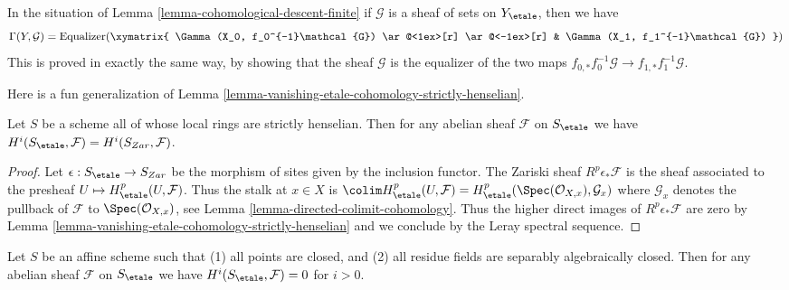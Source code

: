 \begin{remark}
\label{remark-cohomological-descent-finite}
In the situation of Lemma \ref{lemma-cohomological-descent-finite}
if $\mathcal{G}$ is a sheaf of sets on $Y_\etale$, then we have
$$
\Gamma(Y, \mathcal{G}) =
\text{Equalizer}(
\xymatrix{
\Gamma(X_0, f_0^{-1}\mathcal{G})
\ar@<1ex>[r] \ar@<-1ex>[r] &
\Gamma(X_1, f_1^{-1}\mathcal{G})
}
)
$$
This is proved in exactly the same way, by showing that
the sheaf $\mathcal{G}$ is the equalizer of the two maps
$f_{0, *}f_0^{-1}\mathcal{G} \to f_{1, *}f_1^{-1}\mathcal{G}$.
\end{remark}





\noindent
Here is a fun generalization of
Lemma \ref{lemma-vanishing-etale-cohomology-strictly-henselian}.

\begin{lemma}
\label{lemma-local-rings-strictly-henselian}
Let $S$ be a scheme all of whose local rings are strictly henselian.
Then for any abelian sheaf $\mathcal{F}$ on $S_\etale$ we have
$H^i(S_\etale, \mathcal{F}) = H^i(S_{Zar}, \mathcal{F})$.
\end{lemma}

\begin{proof}
Let $\epsilon : S_\etale \to S_{Zar}$ be the morphism of sites given
by the inclusion functor. The Zariski sheaf $R^p\epsilon_*\mathcal{F}$
is the sheaf associated to the presheaf $U \mapsto H^p_\etale(U, \mathcal{F})$.
Thus the stalk at $x \in X$ is
$\colim H^p_\etale(U, \mathcal{F}) =
H^p_\etale(\Spec(\mathcal{O}_{X, x}), \mathcal{G}_x)$
where $\mathcal{G}_x$ denotes the pullback of $\mathcal{F}$
to $\Spec(\mathcal{O}_{X, x})$, see
Lemma \ref{lemma-directed-colimit-cohomology}.
Thus the higher direct images of $R^p\epsilon_*\mathcal{F}$ are
zero by
Lemma \ref{lemma-vanishing-etale-cohomology-strictly-henselian}
and we conclude by the Leray spectral sequence.
\end{proof}

\begin{lemma}
\label{lemma-affine-only-closed-points}
Let $S$ be an affine scheme such that
(1) all points are closed, and (2) all residue fields are separably
algebraically closed. Then
for any abelian sheaf $\mathcal{F}$ on $S_\etale$ we have
$H^i(S_\etale, \mathcal{F}) = 0$ for $i > 0$.
\end{lemma}

